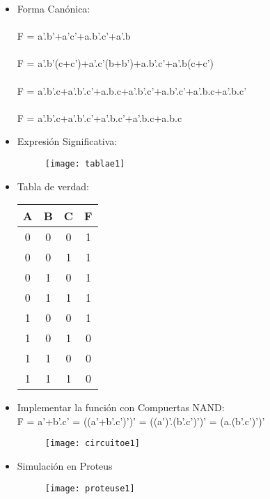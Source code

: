 \documentclass{article}
\begin{document}
            \begin{itemize}
            \item Forma Canónica:\\\\
            F = a'.b'+a'c'+a.b'.c'+a'.b\\\\
            F = a'.b'(c+c')+a'.c'(b+b')+a.b'.c'+a'.b(c+c')\\\\
            F = a'.b'.c+a'.b'.c'+a.b.c+a'.b'.c'+a.b'.c'+a'.b.c+a'.b.c'\\\\
            F = a'.b'.c+a'.b'.c'+a'.b.c'+a'.b.c+a.b.c
            \item Expresión Significativa:
                \begin{figure}[H]
                \centering
                \texttt{[image: tablae1]}
                \end{figure}
            \item Tabla de verdad:
                \begin{center}
                \renewcommand{\arraystretch}{1.5}
                \begin{tabular}{ c c c|c } 
                A & B & C & F \\ 
                \hline
                 0 & 0 & 0 & 1\\ 
                 0 & 0 & 1 & 1\\ 
                 0 & 1 & 0 & 1\\ 
                 0 & 1 & 1 & 1\\ 
                 1 & 0 & 0 & 1\\ 
                 1 & 0 & 1 & 0\\ 
                 1 & 1 & 0 & 0\\ 
                 1 & 1 & 1 & 0\\ 
                 \end{tabular}
                \end{center}
            \item Implementar la función con Compuertas NAND:\\
                    F = a'+b'.c' = ((a'+b'.c')')' = ((a')'.(b'.c')')' = (a.(b'.c')')'
                \begin{figure}[H]
                \centering
                \texttt{[image: circuitoe1]}
                \end{figure}
            \item Simulación en Proteus
                \begin{figure}[H]
                \centering
                \texttt{[image: proteuse1]}
                \end{figure}
            \end{itemize}
        \newpage
\end{document}
